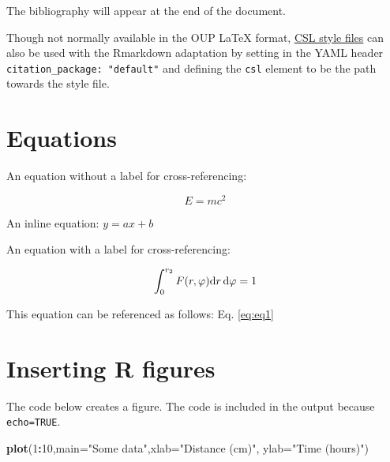 \documentclass[webpdf,large,modern,namedate]{oup-authoring-template}
\newenvironment{Shaded}{\begin{snugshade}}{\end{snugshade}}
\newcommand{\AttributeTok}[1]{\textcolor[rgb]{0.13,0.29,0.53}{#1}}
\newcommand{\DecValTok}[1]{\textcolor[rgb]{0.00,0.00,0.81}{#1}}
\newcommand{\FunctionTok}[1]{\textcolor[rgb]{0.13,0.29,0.53}{\textbf{#1}}}
\newcommand{\NormalTok}[1]{#1}
\newcommand{\SpecialCharTok}[1]{\textcolor[rgb]{0.81,0.36,0.00}{\textbf{#1}}}
\newcommand{\StringTok}[1]{\textcolor[rgb]{0.31,0.60,0.02}{#1}}
\theoremstyle{thmstyleone}
\theoremstyle{thmstyletwo}
\theoremstyle{thmstylethree}
\begin{document}
The bibliography will appear at the end of the document.

Though not normally available in the OUP LaTeX format,
\href{https://www.zotero.org/styles}{CSL style files} can also be used
with the Rmarkdown adaptation by setting in the YAML header
\texttt{citation\_package:\ "default"} and defining the \texttt{csl}
element to be the path towards the style file.

\hypertarget{equations}{%
\section{Equations}\label{equations}}

An equation without a label for cross-referencing:

\[
E=mc^2
\]

An inline equation: \(y=ax+b\)

An equation with a label for cross-referencing:

\begin{equation}\label{eq:eq1}
\int^{r_2}_0 F(r,\varphi){\rm d}r\,{\rm d}\varphi = 1
\end{equation}

This equation can be referenced as follows: Eq. \ref{eq:eq1}

\hypertarget{inserting-r-figures}{%
\section{Inserting R figures}\label{inserting-r-figures}}

The code below creates a figure. The code is included in the output
because \texttt{echo=TRUE}.

\begin{Shaded}
\begin{Highlighting}[]
\FunctionTok{plot}\NormalTok{(}\DecValTok{1}\SpecialCharTok{:}\DecValTok{10}\NormalTok{,}\AttributeTok{main=}\StringTok{"Some data"}\NormalTok{,}\AttributeTok{xlab=}\StringTok{"Distance (cm)"}\NormalTok{,}
     \AttributeTok{ylab=}\StringTok{"Time (hours)"}\NormalTok{)}
\end{Highlighting}
\end{Shaded}
\end{document}
